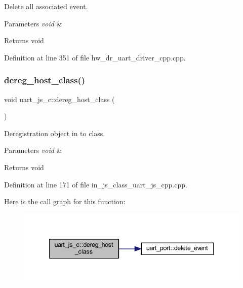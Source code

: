 Delete all associated event. 


\begin{DoxyParams}{Parameters}
{\em void} & \\
\hline
\end{DoxyParams}
\begin{DoxyReturn}{Returns}
void 
\end{DoxyReturn}


Definition at line 351 of file hw\+\_\+dr\+\_\+uart\+\_\+driver\+\_\+cpp.\+cpp.

\mbox{\label{group___u_a_r_t_gab4107ac14df0dcddb8238010e40ae994}} 
\subsubsection{dereg\_host\_class()}
{\footnotesize\ttfamily void uart\+\_\+js\+\_\+c\+::dereg\+\_\+host\+\_\+class (\begin{DoxyParamCaption}\item[{void}]{ }\end{DoxyParamCaption})}



Deregistration object in to class. 


\begin{DoxyParams}{Parameters}
{\em void} & \\
\hline
\end{DoxyParams}
\begin{DoxyReturn}{Returns}
void 
\end{DoxyReturn}


Definition at line 171 of file in\+\_\+js\+\_\+class\+\_\+uart\+\_\+js\+\_\+cpp.\+cpp.

Here is the call graph for this function\+:
\nopagebreak
\begin{figure}[H]
\begin{center}
\leavevmode
\includegraphics[width=341pt]{group___u_a_r_t_gab4107ac14df0dcddb8238010e40ae994_cgraph}
\end{center}
\end{figure}
\mbox{\label{group___u_a_r_t_gae2aa08b0600c3b10f21f0a613dda3a66}} 
